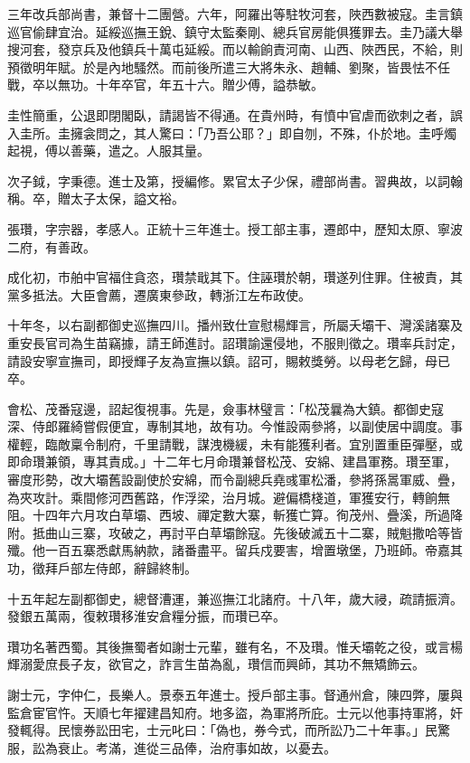 \begin{pinyinscope}
三年改兵部尚書，兼督十二團營。六年，阿羅出等駐牧河套，陜西數被寇。圭言鎮巡官偷肆宜治。延綏巡撫王銳、鎮守太監秦剛、總兵官房能俱獲罪去。圭乃議大舉搜河套，發京兵及他鎮兵十萬屯延綏。而以輸餉責河南、山西、陜西民，不給，則預徵明年賦。於是內地騷然。而前後所遣三大將朱永、趙輔、劉聚，皆畏怯不任戰，卒以無功。十年卒官，年五十六。贈少傅，謚恭敏。

圭性簡重，公退即閉閣臥，請謁皆不得通。在貴州時，有憤中官虐而欲刺之者，誤入圭所。圭擁衾問之，其人驚曰：「乃吾公耶？」即自刎，不殊，仆於地。圭呼燭起視，傅以善藥，遣之。人服其量。

次子鉞，字秉德。進士及第，授編修。累官太子少保，禮部尚書。習典故，以詞翰稱。卒，贈太子太保，謚文裕。

張瓚，字宗器，孝感人。正統十三年進士。授工部主事，遷郎中，歷知太原、寧波二府，有善政。

成化初，市舶中官福住貪恣，瓚禁戢其下。住誣瓚於朝，瓚遂列住罪。住被責，其黨多抵法。大臣會薦，遷廣東參政，轉浙江左布政使。

十年冬，以右副都御史巡撫四川。播州致仕宣慰楊輝言，所屬夭壩干、灣溪諸寨及重安長官司為生苗竊據，請王師進討。詔瓚諭還侵地，不服則徵之。瓚率兵討定，請設安寧宣撫司，即授輝子友為宣撫以鎮。詔可，賜敕獎勞。以母老乞歸，母已卒。

會松、茂番寇邊，詔起復視事。先是，僉事林璧言：「松茂曩為大鎮。都御史寇深、侍郎羅綺嘗假便宜，專制其地，故有功。今惟設兩參將，以副使居中調度。事權輕，臨敵稟令制府，千里請戰，謀洩機緩，未有能獲利者。宜別置重臣彈壓，或即命瓚兼領，專其責成。」十二年七月命瓚兼督松茂、安綿、建昌軍務。瓚至軍，審度形勢，改大壩舊設副使於安綿，而令副總兵堯彧軍松潘，參將孫暠軍威、疊，為夾攻計。乘間修河西舊路，作浮梁，治月城。避偏橋棧道，軍獲安行，轉餉無阻。十四年六月攻白草壩、西坡、禪定數大寨，斬獲亡算。徇茂州、疊溪，所過降附。抵曲山三寨，攻破之，再討平白草壩餘寇。先後破滅五十二寨，賊魁撒哈等皆殲。他一百五寨悉獻馬納款，諸番盡平。留兵戍要害，增置墩堡，乃班師。帝嘉其功，徵拜戶部左侍郎，辭歸終制。

十五年起左副都御史，總督漕運，兼巡撫江北諸府。十八年，歲大祲，疏請振濟。發銀五萬兩，復敕瓚移淮安倉糧分振，而瓚已卒。

瓚功名著西蜀。其後撫蜀者如謝士元輩，雖有名，不及瓚。惟夭壩乾之役，或言楊輝溺愛庶長子友，欲官之，詐言生苗為亂，瓚信而興師，其功不無矯飾云。

謝士元，字仲仁，長樂人。景泰五年進士。授戶部主事。督通州倉，陳四弊，屢與監倉宦官忤。天順七年擢建昌知府。地多盜，為軍將所庇。士元以他事持軍將，奸發輒得。民懷券訟田宅，士元叱曰：「偽也，券今式，而所訟乃二十年事。」民驚服，訟為衰止。考滿，進從三品俸，治府事如故，以憂去。


\end{pinyinscope}
